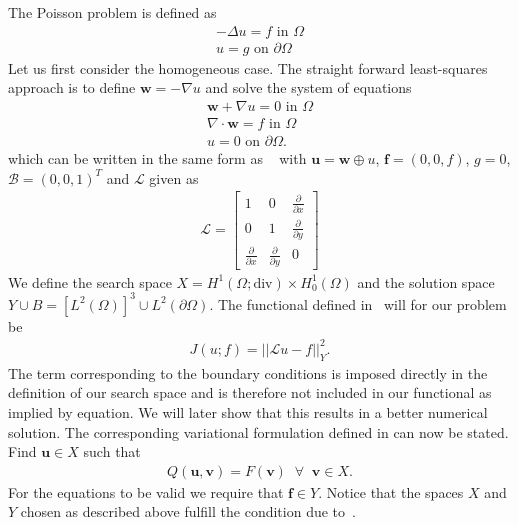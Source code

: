 The Poisson problem is defined as 
\begin{align}
	-\Delta u = f \text{ in } \Omega \\
	u = g \text{ on } \partial \Omega
	\label{eq:Poisson}
\end{align}
Let us first consider the homogeneous case. The straight forward least-squares approach is to define $\mathbf{w} = -\nabla u$ and solve the system of equations 
\begin{align}
	\mathbf{w} + \nabla u = 0 \text{ in } \Omega \\
	\nabla \cdot \mathbf{w} = f \text{ in } \Omega \\
	u = 0 \text{ on } \partial \Omega.
	\label{eq:PoissonSystem}
\end{align}
which can be written in the same form as ~ with $ \mathbf{u} = \mathbf{w} \oplus u $, $\mathbf{f} = (0,0,f)$, $g=0$, $\mathcal{B} = (0,0,1)^T $ and $\mathcal{L}$ given as 
\begin{align}
	\mathcal{L} =
	\begin{bmatrix}
		1 & 0 & \frac{\partial} {\partial x}  \\
		0 & 1 & \frac{\partial} {\partial y}  \\
    \frac{\partial} {\partial x} & \frac{\partial} {\partial y} & 0 
	\end{bmatrix}
	\label{eq:Amatrix}
\end{align}
We define the search space $X =  H^1(\Omega;\text{div}) \times H_0^1(\Omega)$ and the solution space $Y \cup  B  = [L^2(\Omega)]^3\cup L^2(\partial \Omega) $. The functional defined in~ will for our problem be 
\begin{align}
	J(u;f) = ||\mathcal{L}u-f||^2_Y.
	\label{eq:lsFunctionalPoisson}
\end{align}
The term corresponding to the boundary conditions is imposed directly in the definition of our search space and is therefore not included in our functional as implied by equation. We will later show that this results in a better numerical solution. The corresponding variational formulation defined in can now be stated. Find $ \mathbf{u} \in X $ such that
\begin{align}
	Q(\mathbf{u},\mathbf{v}) = F(\mathbf{v}) \;\; \forall \;\; \mathbf{v} \in X.
	\label{eq:VariationalFormulationPoisson}
\end{align}
For the equations to be valid we require that $\mathbf{f} \in Y$.
Notice that the spaces $X$ and $Y$ chosen as described above fulfill the condition due to~\cite{Bochev}. 
%
